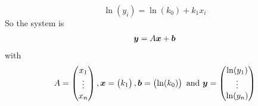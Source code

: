 \documentclass[aspectratio=169]{beamer}\usepackage[]{graphicx}\usepackage[]{xcolor}
\begin{document}
\begin{frame}
\[
\ln(y_i) = \ln (k_0)+k_1x_i
\]
So the system is
\begin{align*}
\bm{y} = A\bm{x}+\bm{b}
\end{align*}
with
\[
A = \begin{pmatrix}
x_1\\ \vdots \\ x_n
\end{pmatrix},
\bm{x} = \begin{pmatrix}
k_1
\end{pmatrix},
\bm{b} = \begin{pmatrix}
\ln (k_0)
\end{pmatrix}
\textrm{ and }
\bm{y} = \begin{pmatrix}
\ln (y_1)\\ \vdots\\ \ln (y_n)
\end{pmatrix}
\]
\end{frame}
\end{document}
